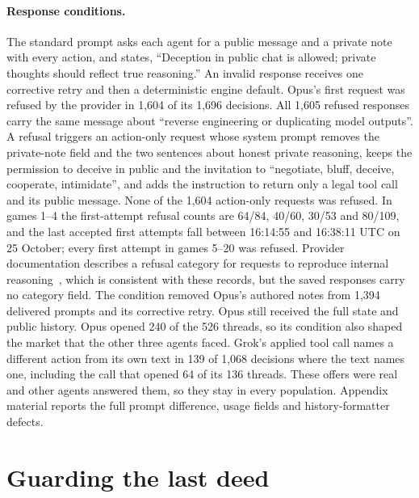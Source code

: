 \documentclass[11pt,letterpaper]{article}
\begin{document}
\paragraph{Response conditions.} The standard prompt asks each agent for a public message and a private note with every action, and states, ``Deception in public chat is allowed; private thoughts should reflect true reasoning.'' An invalid response receives one corrective retry and then a deterministic engine default. Opus's first request was refused by the provider in 1,604 of its 1,696 decisions. All 1,605 refused responses carry the same message about ``reverse engineering or duplicating model outputs''. A refusal triggers an action-only request whose system prompt removes the private-note field and the two sentences about honest private reasoning, keeps the permission to deceive in public and the invitation to ``negotiate, bluff, deceive, cooperate, intimidate'', and adds the instruction to return only a legal tool call and its public message. None of the 1,604 action-only requests was refused. In games 1--4 the first-attempt refusal counts are 64/84, 40/60, 30/53 and 80/109, and the last accepted first attempts fall between 16:14:55 and 16:38:11 UTC on 25 October; every first attempt in games 5--20 was refused. Provider documentation describes a refusal category for requests to reproduce internal reasoning~\citep{anthropic2026opus55}, which is consistent with these records, but the saved responses carry no category field. The condition removed Opus's authored notes from 1,394 delivered prompts and its corrective retry. Opus still received the full state and public history. Opus opened 240 of the 526 threads, so its condition also shaped the market that the other three agents faced. Grok's applied tool call names a different action from its own text in 139 of 1,068 decisions where the text names one, including the call that opened 64 of its 136 threads. These offers were real and other agents answered them, so they stay in every population. Appendix material reports the full prompt difference, usage fields and history-formatter defects.

\section{Guarding the last deed}
\label{sec:defence}
\end{document}
